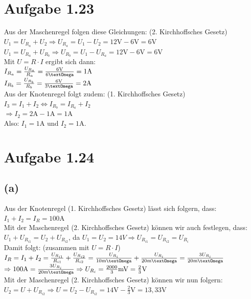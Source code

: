\documentclass[]{article}
\newcommand{\eq}{\Leftrightarrow}
\newcommand{\rarr}{\Rightarrow}
\newcommand{\unit}[1]{\text{#1}}
\begin{document}
\section*{Aufgabe 1.23}
\par
	Aus der Maschenregel folgen diese Gleichungen: (2. Kirchhoffsches Gesetz)\\
	$U_1 = U_{R_a} + U_2 \rarr U_{R_a} = U_1 - U_2 = 12\unit{V} - 6\unit{V} = 6\unit{V}$\\
	$U_1 = U_{R_a} + U_{R_b} \rarr U_{R_b} = U_1 - U_{R_a} = 12\unit{V}-6\unit{V} = 6\unit{V}$\\
	Mit $U = R \cdot I$ ergibt sich dann:\\
	$I_{R_a} = \frac{U_{R_a}}{R_a} = \frac{6\unit{V}}{6\unit{\textOmega}} = 1\unit{A}$\\
	$I_{R_b} = \frac{U_{R_b}}{R_b} = \frac{6\unit{V}}{3\unit{\textOmega}} = 2\unit{A}$\\
	Aus der Knotenregel folgt zudem: (1. Kirchhoffsches Gesetz)\\
	$I_3 = I_1 + I_2 \eq I_{R_b} = I_{R_a} + I_2$\\
	$\rarr I_2 = 2\unit{A} - 1\unit{A} = 1\unit{A}$\\
	Also: $I_1 = 1\unit{A}$ und $I_2 = 1\unit{A}$.
\section*{Aufgabe 1.24}
\par
\subsection*{(a)}
	Aus der Knotenregel (1. Kirchhoffsches Gesetz) lässt sich folgern, dass:\\
	$I_1 + I_2 = I_R = 100\unit{A}$\\
	Mit der Maschenregel (2. Kirchhoffsches Gesetz) können wir auch festlegen, dass:\\
	$U_1 + U_{R_{i1}} = U_2 + U_{R_{i2}}$, da $U_1 = U_2 = 14V \rarr U_{R_{i1}} = U_{R_{i2}} = U_{R_i}$\\
	Damit folgt: (zusammen mit $U=R\cdot I$)\\
	$I_R = I_1 + I_2 = \frac{U_{R_{i1}}}{R_{i1}} + \frac{U_{R_{i2}}}{R_{i2}} = \frac{U_{R_i}}{10\unit{m\textOmega}} + \frac{U_{R_i}}{20\unit{m\textOmega}} = \frac{3U_{R_i}}{20\unit{m\textOmega}}$\\
	$\rarr 100\unit{A} = \frac{3U_{R_i}}{20\unit{m\textOmega}} \rarr U_{R_i} = \frac{2000}{3}\unit{mV} = \frac{2}{3}\unit{V}$\\
	Mit der Maschenregel (2. Kirchhoffsches Gesetz) können wir nun folgern:\\
	$U_2 = U + U_{R_{i2}} \rarr U = U_2 - U_{R_{i2}} = 14\unit{V}-\frac{2}{3}\unit{V} = 13,33\unit{V}$
\end{document}
